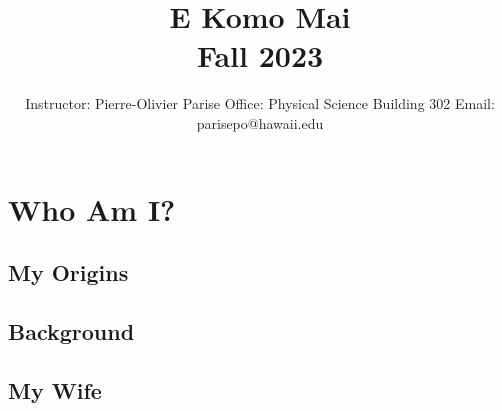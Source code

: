 \documentclass[12pt, xcolor=dvipsnames]{beamer}
\title{E Komo Mai \\ Fall 2023}
\author[P.-O. Parise]{Instructor: Pierre-Olivier Parise \newline Office: Physical Science Building 302 \newline Email: parisepo@hawaii.edu}
\date{}
\begin{document}
\maketitle

\section{Who Am I?}

	\subsection{My Origins}

	\begin{frame}

	\end{frame}

	\begin{frame}

	\end{frame}

	\begin{frame}

	\end{frame}

	\begin{frame}

	\end{frame}

	\subsection{Background}

	\begin{frame}

	\end{frame}

	\begin{frame}

	\end{frame}

	\subsection{My Wife}

	\begin{frame}

	\end{frame}
\end{document}
